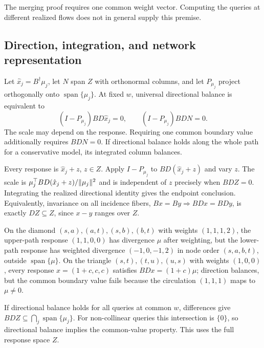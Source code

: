 \begin{rmk}\label{rmk:quantifier}
The merging proof requires one common weight vector. Computing the
queries at different realized flows does not in general supply this
premise.
\end{rmk}

\subsection{Direction, integration, and network representation}\label{supp:criteria}
\begin{proposition}\label{prop:directional}
Let $\hat x_j=B^\dagger\mu_j$, let $N$ span $Z$ with orthonormal
columns, and let $P_{\mu_j}$ project orthogonally onto
$\operatorname{span}\{\mu_j\}$. At fixed $w$, universal directional
balance is equivalent to
\[
(I-P_{\mu_j})BD\hat x_j=0,\qquad (I-P_{\mu_j})BDN=0.
\]
The scale may depend on the response. Requiring one common boundary value
additionally requires $BDN=0$. If directional balance holds along the
whole path for a conservative model, its integrated column balances.
\end{proposition}
\begin{pf}
Every response is $\hat x_j+z$, $z\in Z$. Apply $I-P_{\mu_j}$ to
$BD(\hat x_j+z)$ and vary $z$. The scale is
$\mu_j^\top BD(\hat x_j+z)/\lVert \mu_j \rVert^2$ and is independent of
$z$ precisely when $BDZ=0$. Integrating the realized directional
identity gives the endpoint conclusion. Equivalently, invariance on
all incidence fibers, $Bx=By\Rightarrow BDx=BDy$, is exactly
$DZ\subseteq Z$, since $x-y$ ranges over $Z$.
\end{pf}

\begin{example}\label{ex:triangle}
On the diamond $(s,a),(a,t),(s,b),(b,t)$ with weights $(1,1,1,2)$,
the upper-path response $(1,1,0,0)$ has divergence $\mu$ after
weighting, but the lower-path response has weighted divergence
$(-1,0,-1,2)$ in node order $(s,a,b,t)$, outside $\operatorname{span}\{\mu\}$.
On the triangle $(s,t),(t,u),(u,s)$ with weights $(1,0,0)$, every
response $x=(1+c,c,c)$ satisfies $BDx=(1+c)\mu$; direction balances,
but the common boundary value fails because the circulation $(1,1,1)$ maps
to $\mu\ne0$.
\end{example}

If directional balance holds for all
queries at common $w$, differences give
$BDZ\subseteq\bigcap_j\operatorname{span}\{\mu_j\}$. For non-collinear
queries this intersection is $\{0\}$, so directional balance implies
the common-value property. This uses the full response space $Z$.

